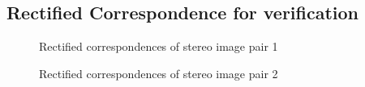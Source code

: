 \documentclass{article}
\begin{document}
\newpage
\subsection{Rectified Correspondence for verification}
\begin{figure}[!htbp]
     \centering
     \captionsetup[subfigure]{labelformat=empty}
    \caption{Rectified correspondences of stereo image pair 1}
    \label{fig:rect_corr_1}
\end{figure}
\begin{figure}[!htbp]
     \centering
     \captionsetup[subfigure]{labelformat=empty}
    \caption{Rectified correspondences of stereo image pair 2}
    \label{fig:rect_corr_2}
\end{figure}


\newpage
\end{document}
